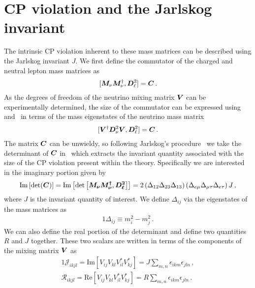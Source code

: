 \section{CP violation and the Jarlskog invariant}\label{sec:jscalar}
\noindent The intrinsic CP violation inherent to these mass matrices can be described using the Jarlskog invariant $J$. We first define the commutator of the charged and neutral lepton mass matrices as 
\begin{alignat}{1}
	\label{comm:1} [\boldsymbol{M}_{\nu}\boldsymbol{M}_{\nu}^{\dagger},\boldsymbol{D}_{\ell}^{2}] = \boldsymbol{C}\,.
\end{alignat}
As the degrees of freedom of the neutrino mixing matrix $\boldsymbol{V}$ can be experimentally determined, the size of the commutator can be expressed using~ and~ in terms of the mass eigenstates of the neutrino mass matrix
\begin{alignat}{1}
	\label{comm:2} [\boldsymbol{V}^{\dagger}\boldsymbol{D}_{\nu}^{2}\boldsymbol{V},\boldsymbol{D}_{\ell}^{2}] = \boldsymbol{C}\,.
\end{alignat}
The matrix $\boldsymbol{C}$ can be unwieldy, so following Jarlskog's procedure~\citep{jarlskog1985commutator,jarlskog1985basis,jarlskog2005invariants} we take the determinant of $\boldsymbol{C}$ in~ which extracts the invariant quantity associated with the size of the CP violation present within the theory. Specifically we are interested in the imaginary portion given by
\begin{alignat}{1}
	\label{det:1} \mathrm{Im}\left[\mathrm{det}(\boldsymbol{C})\right]=\mathrm{Im}\left[\mathrm{det}\left[\boldsymbol{M_{\nu}}\boldsymbol{M_{\nu}^{\dagger}},\boldsymbol{D_{\ell}^{2}}\right]\right]=2\left(\Delta_{12}\Delta_{23}\Delta_{13}\right)\left(\Delta_{e\mu}\Delta_{\mu\tau}\Delta_{e\tau}\right)J\,,
\end{alignat}
where $J$ is the invariant quantity of interest. We define $\Delta_{ij}$ via the eigenstates of the mass matrices as
\begin{alignat}{1}
	\label{delta:1} \Delta_{ij}\equiv m^{2}_{i}-m^{2}_{j}\,.
\end{alignat}
We can also define the real portion of the determinant and define two quantities $R$ and $J$ together. These two scalars are written in terms of the components of the mixing matrix $\boldsymbol{V}$ as
\begin{alignat}{1}
	\label{j:1}
    {\mathcal J}_{ikjl} = \mathrm{Im}\left[V_{ij}V_{kl}V^{*}_{il}V^{*}_{kj}\right]=J\sum_{m,n}\epsilon_{ikm}\epsilon_{jln}\,,\\
    \label{j:2}
    {\mathcal R}_{ikjl} = \mathrm{Re}\left[V_{ij}V_{kl}V^{*}_{il}V^{*}_{kj}\right]=R\sum_{m,n}\epsilon_{ikm}\epsilon_{jln}\,.
\end{alignat}
